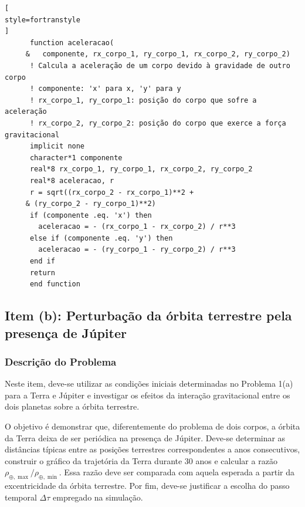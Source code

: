 \documentclass[12pt,a4paper]{article}
\begin{document}
\begin{lstlisting}[
style=fortranstyle
]
      function aceleracao(
     &   componente, rx_corpo_1, ry_corpo_1, rx_corpo_2, ry_corpo_2)
      ! Calcula a aceleração de um corpo devido à gravidade de outro corpo
      ! componente: 'x' para x, 'y' para y
      ! rx_corpo_1, ry_corpo_1: posição do corpo que sofre a aceleração
      ! rx_corpo_2, ry_corpo_2: posição do corpo que exerce a força gravitacional
      implicit none
      character*1 componente
      real*8 rx_corpo_1, ry_corpo_1, rx_corpo_2, ry_corpo_2
      real*8 aceleracao, r
      r = sqrt((rx_corpo_2 - rx_corpo_1)**2 + 
     & (ry_corpo_2 - ry_corpo_1)**2)
      if (componente .eq. 'x') then
        aceleracao = - (rx_corpo_1 - rx_corpo_2) / r**3
      else if (componente .eq. 'y') then
        aceleracao = - (ry_corpo_1 - ry_corpo_2) / r**3
      end if
      return
      end function
\end{lstlisting}


\subsection{Item (b): Perturbação da órbita terrestre pela presença de Júpiter}

\subsubsection{Descrição do Problema}

Neste item, deve-se utilizar as condições iniciais determinadas no Problema 1(a) para a Terra e Júpiter e investigar os efeitos da interação gravitacional entre os dois planetas sobre a órbita terrestre.

O objetivo é demonstrar que, diferentemente do problema de dois corpos, a órbita da Terra deixa de ser periódica na presença de Júpiter. Deve-se determinar as distâncias típicas entre as posições terrestres correspondentes a anos consecutivos, construir o gráfico da trajetória da Terra durante 30 anos e calcular a razão $\rho_{\oplus,\max}/\rho_{\oplus,\min}$. Essa razão deve ser comparada com aquela esperada a partir da excentricidade da órbita terrestre. Por fim, deve-se justificar a escolha do passo temporal $\Delta\tau$ empregado na simulação.

\end{document}
